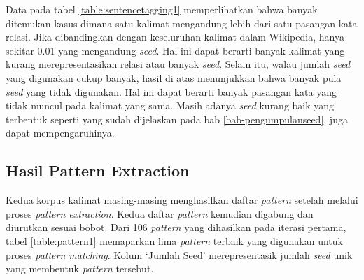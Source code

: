 \begin{table}
  \centering
  \caption{Hasil \textit{sentence tagging} dengan \textit{seed}}
  \label{table:sentencetagging1}
\end{table}

\noindent Data pada tabel \ref{table:sentencetagging1} memperlihatkan bahwa banyak ditemukan kasus dimana satu kalimat mengandung lebih dari satu pasangan kata relasi. Jika dibandingkan dengan keseluruhan kalimat dalam Wikipedia, hanya sekitar 0.01 yang mengandung \textit{seed}. Hal ini dapat berarti banyak kalimat yang kurang merepresentasikan relasi atau banyak \textit{seed}. Selain itu, walau jumlah \textit{seed} yang digunakan cukup banyak, hasil di atas menunjukkan bahwa banyak pula \textit{seed} yang tidak digunakan. Hal ini dapat berarti banyak pasangan kata yang tidak muncul pada kalimat yang sama. Masih adanya \textit{seed} kurang baik yang terbentuk seperti yang sudah dijelaskan pada bab \ref{bab-pengumpulanseed}, juga dapat mempengaruhinya.

\subsection{Hasil Pattern Extraction}
Kedua korpus kalimat masing-masing menghasilkan daftar \textit{pattern} setelah melalui proses \textit{pattern extraction}. Kedua daftar \textit{pattern} kemudian digabung dan diurutkan sesuai bobot. Dari 106 \textit{pattern} yang dihasilkan pada iterasi pertama, tabel \ref{table:pattern1} memaparkan lima \textit{pattern} terbaik yang digunakan untuk proses \textit{pattern matching}. Kolum `Jumlah Seed' merepresentasik jumlah \textit{seed} unik yang membentuk \textit{pattern} tersebut.

